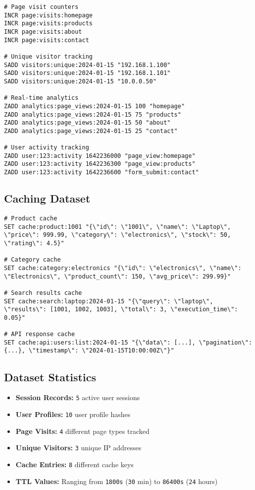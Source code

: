 \begin{verbatim}
# Page visit counters
INCR page:visits:homepage
INCR page:visits:products
INCR page:visits:about
INCR page:visits:contact

# Unique visitor tracking
SADD visitors:unique:2024-01-15 "192.168.1.100"
SADD visitors:unique:2024-01-15 "192.168.1.101"
SADD visitors:unique:2024-01-15 "10.0.0.50"

# Real-time analytics
ZADD analytics:page_views:2024-01-15 100 "homepage"
ZADD analytics:page_views:2024-01-15 75 "products"
ZADD analytics:page_views:2024-01-15 50 "about"
ZADD analytics:page_views:2024-01-15 25 "contact"

# User activity tracking
ZADD user:123:activity 1642236000 "page_view:homepage"
ZADD user:123:activity 1642236300 "page_view:products"
ZADD user:123:activity 1642236600 "form_submit:contact"
\end{verbatim}

\subsection{Caching Dataset}

\begin{verbatim}
# Product cache
SET cache:product:1001 "{\"id\": \"1001\", \"name\": \"Laptop\", \"price\": 999.99, \"category\": \"electronics\", \"stock\": 50, \"rating\": 4.5}"

# Category cache
SET cache:category:electronics "{\"id\": \"electronics\", \"name\": \"Electronics\", \"product_count\": 150, \"avg_price\": 299.99}"

# Search results cache
SET cache:search:laptop:2024-01-15 "{\"query\": \"laptop\", \"results\": [1001, 1002, 1003], \"total\": 3, \"execution_time\": 0.05}"

# API response cache
SET cache:api:users:list:2024-01-15 "{\"data\": [...], \"pagination\": {...}, \"timestamp\": \"2024-01-15T10:00:00Z\"}"
\end{verbatim}

\subsection{Dataset Statistics}

\begin{itemize}
    \item \textbf{Session Records:} \texttt{5} active user sessions
    \item \textbf{User Profiles:} \texttt{10} user profile hashes
    \item \textbf{Page Visits:} \texttt{4} different page types tracked
    \item \textbf{Unique Visitors:} \texttt{3} unique IP addresses
    \item \textbf{Cache Entries:} \texttt{8} different cache keys
    \item \textbf{TTL Values:} Ranging from \texttt{1800s} (\texttt{30} min) to \texttt{86400s} (\texttt{24} hours)
\end{itemize}

